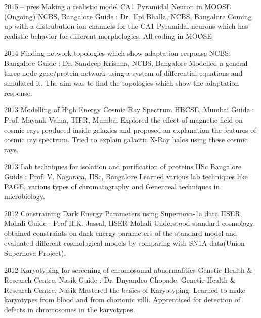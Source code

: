 \documentclass[11pt]{friggeri-cv}%
\begin{document}
\begin{entrylist}
  \entry
    {2015 -- pres}
    {Making a realistic model CA1 Pyramidal Neuron in MOOSE (Ongoing)}
    {NCBS, Bangalore}
    {Guide : Dr. Upi Bhalla, NCBS, Bangalore}
    {Coming up with a distrubution ion channels for the CA1 Pyramidal neurons which has realistic behavior for different morphologies. All coding in MOOSE}
\end{entrylist}
\begin{entrylist}
  \entry
    {2014}
    {Finding network topologies which show adaptation response}
    {NCBS, Bangalore}
    {Guide : Dr. Sandeep Krishna, NCBS, Bangalore}
    {Modelled a general three node gene/protein network using a system of differential equations and simulated it. The aim was to find the topologies which show the adaptation response.}
\end{entrylist}
\begin{entrylist}

  \entry
    {2013}
    {Modelling of High Energy Cosmic Ray Spectrum}
    {HBCSE, Mumbai}
    {Guide : Prof. Mayank Vahia, TIFR, Mumbai}
    {Explored the effect of magnetic field on cosmic rays produced inside galaxies and proposed an explanation the features of cosmic ray spectrum. Tried to explain galactic X-Ray halos using these cosmic rays.}
\end{entrylist}
\begin{entrylist}
    
  \entry
    {2013}
    {Lab techniques for isolation and purification of proteins}
    {IISc Bangalore}
    {
    Guide : Prof. V. Nagaraja, IISc, Bangalore}
    {Learned various lab techniques like PAGE, various types of chromatography and Genenreal techniques in microbiology.}    
\end{entrylist}
\begin{entrylist}

  \entry
    {2012}
    {Constraining Dark Energy Parameters using Supernova-1a data}
    {IISER, Mohali}
    {Guide : Prof H.K. Jassal, IISER Mohali}
    {Understood standard cosmology,  obtained constraints on dark energy parameters of the standard model and evaluated different cosmological models by comparing with SN1A data(Union Supernova Project).
    }
    
\end{entrylist}
\begin{entrylist}


  \entry
    {2012}
    {Karyotyping for screening of chromosomal abnormalities}
    {Genetic Health \& Research Centre, Nasik}
    {
    Guide : Dr. Dnyandeo Chopade, Genetic Health \& Research Centre, Nasik}
    {
    Mastered the basics of Karyotyping. Learned to make karyotypes from blood and from chorionic villi.  Apprenticed for  detection of defects in chromosomes in the karyotypes.
    }
    \end{entrylist}
\end{document}
